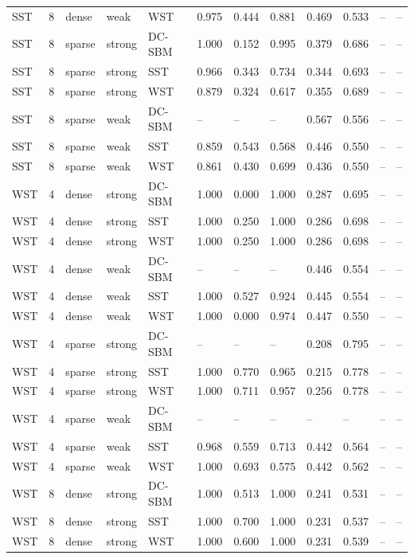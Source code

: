 \begin{table}[!h]
\begin{tabular}[t]{llllllllllll}
SST & 8 & dense & weak & WST & 0.975 & 0.444 & 0.881 & 0.469 & 0.533 & -- & --\\
SST & 8 & sparse & strong & DC-SBM & 1.000 & 0.152 & 0.995 & 0.379 & 0.686 & -- & --\\
SST & 8 & sparse & strong & SST & 0.966 & 0.343 & 0.734 & 0.344 & 0.693 & -- & --\\
SST & 8 & sparse & strong & WST & 0.879 & 0.324 & 0.617 & 0.355 & 0.689 & -- & --\\
SST & 8 & sparse & weak & DC-SBM & -- & -- & -- & 0.567 & 0.556 & -- & --\\
SST & 8 & sparse & weak & SST & 0.859 & 0.543 & 0.568 & 0.446 & 0.550 & -- & --\\
SST & 8 & sparse & weak & WST & 0.861 & 0.430 & 0.699 & 0.436 & 0.550 & -- & --\\
WST & 4 & dense & strong & DC-SBM & 1.000 & 0.000 & 1.000 & 0.287 & 0.695 & -- & --\\
WST & 4 & dense & strong & SST & 1.000 & 0.250 & 1.000 & 0.286 & 0.698 & -- & --\\
WST & 4 & dense & strong & WST & 1.000 & 0.250 & 1.000 & 0.286 & 0.698 & -- & --\\
WST & 4 & dense & weak & DC-SBM & -- & -- & -- & 0.446 & 0.554 & -- & --\\
WST & 4 & dense & weak & SST & 1.000 & 0.527 & 0.924 & 0.445 & 0.554 & -- & --\\
WST & 4 & dense & weak & WST & 1.000 & 0.000 & 0.974 & 0.447 & 0.550 & -- & --\\
WST & 4 & sparse & strong & DC-SBM & -- & -- & -- & 0.208 & 0.795 & -- & --\\
WST & 4 & sparse & strong & SST & 1.000 & 0.770 & 0.965 & 0.215 & 0.778 & -- & --\\
WST & 4 & sparse & strong & WST & 1.000 & 0.711 & 0.957 & 0.256 & 0.778 & -- & --\\
WST & 4 & sparse & weak & DC-SBM & -- & -- & -- & -- & -- & -- & --\\
WST & 4 & sparse & weak & SST & 0.968 & 0.559 & 0.713 & 0.442 & 0.564 & -- & --\\
WST & 4 & sparse & weak & WST & 1.000 & 0.693 & 0.575 & 0.442 & 0.562 & -- & --\\
WST & 8 & dense & strong & DC-SBM & 1.000 & 0.513 & 1.000 & 0.241 & 0.531 & -- & --\\
WST & 8 & dense & strong & SST & 1.000 & 0.700 & 1.000 & 0.231 & 0.537 & -- & --\\
WST & 8 & dense & strong & WST & 1.000 & 0.600 & 1.000 & 0.231 & 0.539 & -- & --\\

\end{tabular}
\end{table}
